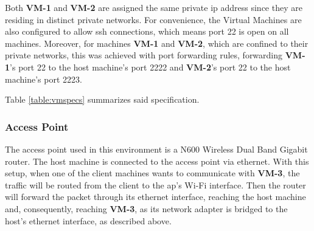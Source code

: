 \documentclass[11pt,twoside,a4paper]{report}
\begin{document}
Both \textbf{VM-1} and \textbf{VM-2} are assigned the same private \ac{ip} address since they are residing in distinct private networks. For convenience, the Virtual Machines are also configured to allow \ac{ssh} connections, which means port 22 is open on all machines. Moreover, for machines \textbf{VM-1} and \textbf{VM-2}, which are confined to their private networks, this was achieved with port forwarding rules, forwarding \textbf{VM-1}'s port 22 to the host machine's port 2222 and \textbf{VM-2}'s port 22 to the host machine's port 2223.

Table \ref{table:vmspecs} summarizes said specification.

\begin{table}[]
\centering
{}
\caption{Development Virtual Machines specification}
\label{table:vmspecs}
\end{table}

\subsubsection{Access Point}

The access point used in this environment is a N600 Wireless Dual Band Gigabit router. The host machine is connected to the access point via ethernet. With this setup, when one of the client machines wants to communicate with \textbf{VM-3}, the traffic will be routed from the client to the \ac{ap}'s Wi-Fi interface. Then the router will forward the packet through its ethernet interface, reaching the host machine and, consequently, reaching \textbf{VM-3}, as its network adapter is bridged to the host's ethernet interface, as described above.
\end{document}
